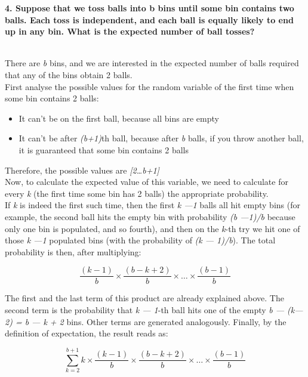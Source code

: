 \documentclass[12pt, letterpaper, twoside]{book}
\begin{document}
\begin{large}
\textbf{4. Suppose that we toss balls into b bins until some bin contains two balls. Each toss is independent, and each ball is equally likely to end up in any bin. What is the expected number of ball tosses?}
\end{large}\\
There are \emph{b} bins, and we are interested in the expected number of balls required that any of the bins obtain 2 balls.\\
First analyse the possible values for the random variable of the first time when some bin contains 2 balls: 
\begin{itemize}
  \item It can't be on the first ball, because all bins are empty
  \item It can't be after \emph{(b+1)}th ball, because after \emph{b} balls, if you throw another ball, it is guaranteed that some bin contains 2 balls
\end{itemize}
Therefore, the possible values are \emph{[2\dots b+1]}\\
Now, to calculate the expected value of this variable, we need to calculate for every \emph{k} (the first time some bin has 2 balls) the appropriate probability.\\
If \emph{k} is indeed the first such time, then the first \emph{k —1} balls all hit empty bins (for example, the second ball hits the empty bin with probability \emph{(b —1)/b} because only one bin is populated, and so fourth), and then on the \emph{k}-th try we hit one of those \emph{k —1} populated bins (with the probability of \emph{(k — 1)/b}). The total probability is then, after multiplying:

\[\frac{(k-1)}{b} \times \frac{(b - k + 2)}{b} \times \dots \times \frac{(b-1)}{b} \]

The first and the last term of this product are already explained above. The second term is the probability that \emph{k — 1}-th ball hits one of the empty \emph{b — (k— 2) = b — k + 2} bins. Other terms are generated analogously. 
Finally, by the definition of expectation, the result reads as: 

\[\sum_{k=2}^{b+1} k \times \frac{(k-1)}{b} \times \frac{(b - k + 2)}{b} \times \dots \times \frac{(b-1)}{b} \]
\end{document}
